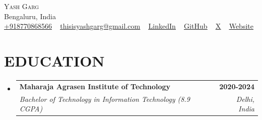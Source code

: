 \documentclass[letterpaper,11pt]{article}
\makeatletter
\newcommand{\resumeSubheading}[4]{
  \vspace{0pt}\item
    \begin{tabular*}{1.0\textwidth}[t]{l@{\extracolsep{\fill}}r}
      \textbf{\large#1} & \textbf{\small #2} \\
      \textit{\large#3} & \textit{\small #4} \\
      
    \end{tabular*}\vspace{-5pt}
}
\newcommand{\resumeSubHeadingListStart}{\begin{itemize}[leftmargin=0.0in, label={}]}
\newcommand{\resumeSubHeadingListEnd}{\end{itemize}}
\makeatother
\begin{document}
\begin{center}
    {\Huge \scshape Yash Garg} \\ \vspace{2pt}
    Bengaluru, India \\ \vspace{2pt}
    \small \href{tel:+918770868566}{\underline{+918770868566}} ~
    \href{mailto:thisisyashgarg@gmail.com}{\underline{thisisyashgarg@gmail.com}} ~ 
    \href{https://www.linkedin.com/in/thisisyashgarg/}{\underline{LinkedIn}} ~
    \href{https://github.com/thisisyashgarg}{\underline{GitHub}} ~
    \href{https://twitter.com/thisisyashgargg}{\underline{X}} ~
    \href{https://thisisyashgarg.github.io/}{\underline{Website}}
    \vspace{-2pt}
\end{center}


\section{EDUCATION}
  \resumeSubHeadingListStart
    \resumeSubheading
      {Maharaja Agrasen Institute of Technology}{2020-2024}
      {Bachelor of Technology in Information Technology (8.9 CGPA)}{Delhi, India}
      
  \resumeSubHeadingListEnd

\end{document}

